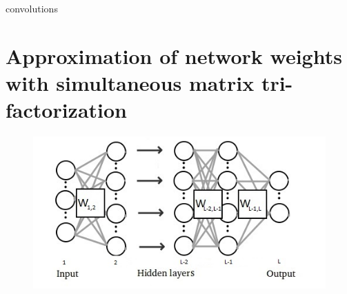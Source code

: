 \documentclass{article} %
\begin{document}
convolutions 


\section{Approximation of network weights with simultaneous matrix
tri-factorization}

\begin{figure}[!ht]
\centering
\includegraphics[width=.8\linewidth]{globokamreza2.jpg}



\label{f:globokamreza}

\end{figure}
\end{document}
